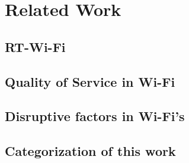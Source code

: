 \chapter{Related Work}
\section{RT-Wi-Fi}
\section{Quality of Service in Wi-Fi}
\section{Disruptive factors in Wi-Fi's}
\section{Categorization of this work}